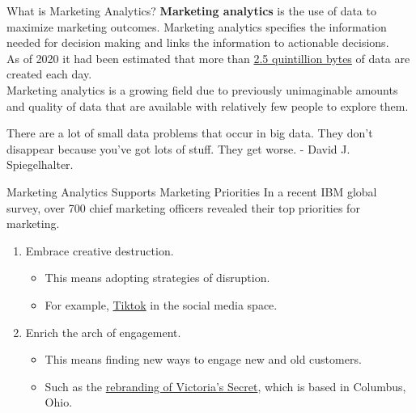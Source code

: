 \documentclass[pdf]{beamer}
\newcommand{\empr}[1]{{\color{franklinblue}\textbf{#1}}}
\theoremstyle{remark}
\theoremstyle{definition}
\begin{document}
\begin{frame}[t]{What is Marketing Analytics?}
\empr{Marketing analytics} is the use of data to maximize marketing outcomes. Marketing analytics specifies the information needed for decision making and links the information to actionable decisions.\\ 
\vspace{1.5ex}
As of 2020 it had been estimated that more than \href{https://us.sganalytics.com/blog/2-5-quintillion-bytes-of-data-generated-everyday-top-data-science-trends-2020/}{2.5 quintillion bytes} of data are created each day.  \\ 
\vspace{1.5ex}
Marketing analytics is a growing field due to previously unimaginable amounts and quality of
data that are available with relatively few people to explore them. \\
\vspace{1.5ex}
\begin{tcolorbox}[colback=white!5,colframe=franklinblue]%
There are a lot of small data problems that occur in big data.  They don't disappear because you've got lots of stuff.  They get worse. - David J. Spiegelhalter.
\end{tcolorbox}
\end{frame}

\begin{frame}[t]{Marketing Analytics Supports Marketing Priorities}
In a recent IBM global survey, over 700 chief marketing officers revealed their top priorities for marketing. \\ 
\vspace{1.5ex}
\begin{enumerate}
\item Embrace creative destruction. 
\begin{itemize}
\item This means adopting strategies of disruption.  
\item For example, \href{https://www.tiktok.com/about?lang=en}{Tiktok} in the social media space.
\end{itemize}
\item Enrich the arch of engagement. 
\begin{itemize}
\item This means finding new ways to engage new and old customers.  
\item Such as the \href{https://adage.com/article/marketing-news-strategy/victorias-secret-continues-rebrand-new-global-push/2437276}{rebranding of Victoria's Secret}, which is based in Columbus, Ohio.
\end{itemize}
\end{enumerate}
\end{frame}
\end{document}
